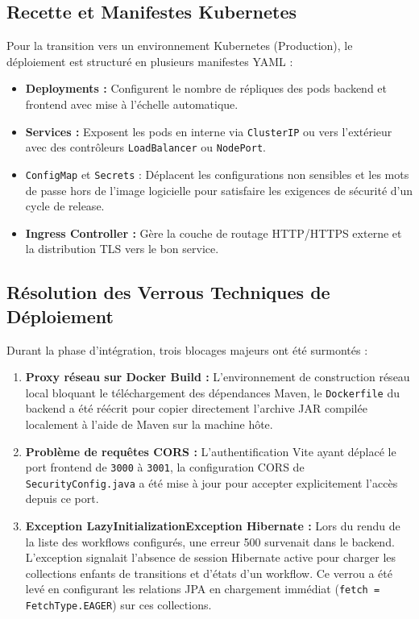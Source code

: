 \documentclass[12pt,a4paper]{article}
\begin{document}
\subsection{Recette et Manifestes Kubernetes}
Pour la transition vers un environnement Kubernetes (Production), le déploiement est structuré en plusieurs manifestes YAML :
\begin{itemize}
    \item \textbf{Deployments :} Configurent le nombre de répliques des pods backend et frontend avec mise à l'échelle automatique.
    \item \textbf{Services :} Exposent les pods en interne via \texttt{ClusterIP} ou vers l'extérieur avec des contrôleurs \texttt{LoadBalancer} ou \texttt{NodePort}.
    \item \texttt{ConfigMap} et \texttt{Secrets} : Déplacent les configurations non sensibles et les mots de passe hors de l'image logicielle pour satisfaire les exigences de sécurité d'un cycle de release.
    \item \textbf{Ingress Controller :} Gère la couche de routage HTTP/HTTPS externe et la distribution TLS vers le bon service.
\end{itemize}

\subsection{Résolution des Verrous Techniques de Déploiement}
Durant la phase d'intégration, trois blocages majeurs ont été surmontés :
\begin{enumerate}
    \item \textbf{Proxy réseau sur Docker Build :} L'environnement de construction réseau local bloquant le téléchargement des dépendances Maven, le \texttt{Dockerfile} du backend a été réécrit pour copier directement l'archive JAR compilée localement à l'aide de Maven sur la machine hôte.
    \item \textbf{Problème de requêtes CORS :} L'authentification Vite ayant déplacé le port frontend de \texttt{3000} à \texttt{3001}, la configuration CORS de \texttt{SecurityConfig.java} a été mise à jour pour accepter explicitement l'accès depuis ce port.
    \item \textbf{Exception LazyInitializationException Hibernate :} Lors du rendu de la liste des workflows configurés, une erreur 500 survenait dans le backend. L'exception signalait l'absence de session Hibernate active pour charger les collections enfants de transitions et d'états d'un workflow. Ce verrou a été levé en configurant les relations JPA en chargement immédiat (\texttt{fetch = FetchType.EAGER}) sur ces collections.
\end{enumerate}
\end{document}
